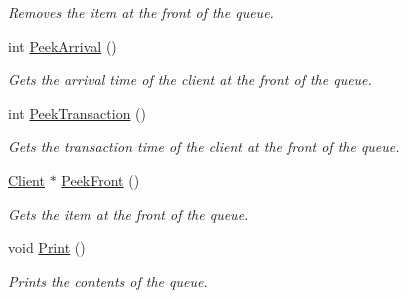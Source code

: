 \begin{DoxyCompactItemize}
\begin{DoxyCompactList}\small\item\em Removes the item at the front of the queue. \end{DoxyCompactList}\item 
int \hyperlink{class_array_queue_bank_a7c8219de8d969bf31651c88839c79b32}{Peek\+Arrival} ()
\begin{DoxyCompactList}\small\item\em Gets the arrival time of the client at the front of the queue. \end{DoxyCompactList}\item 
int \hyperlink{class_array_queue_bank_a8c3fe7fd1d1e6803e8778180dc5faf8d}{Peek\+Transaction} ()
\begin{DoxyCompactList}\small\item\em Gets the transaction time of the client at the front of the queue. \end{DoxyCompactList}\item 
\hyperlink{class_client}{Client} $\ast$ \hyperlink{class_array_queue_bank_a81fcb37e38ef532fcf37d4f47452ae68}{Peek\+Front} ()
\begin{DoxyCompactList}\small\item\em Gets the item at the front of the queue. \end{DoxyCompactList}\item 
void \hyperlink{class_array_queue_bank_aad61c634b9d27a67c1a7217e50959305}{Print} ()
\begin{DoxyCompactList}\small\item\em Prints the contents of the queue. \end{DoxyCompactList}\end{DoxyCompactItemize}
